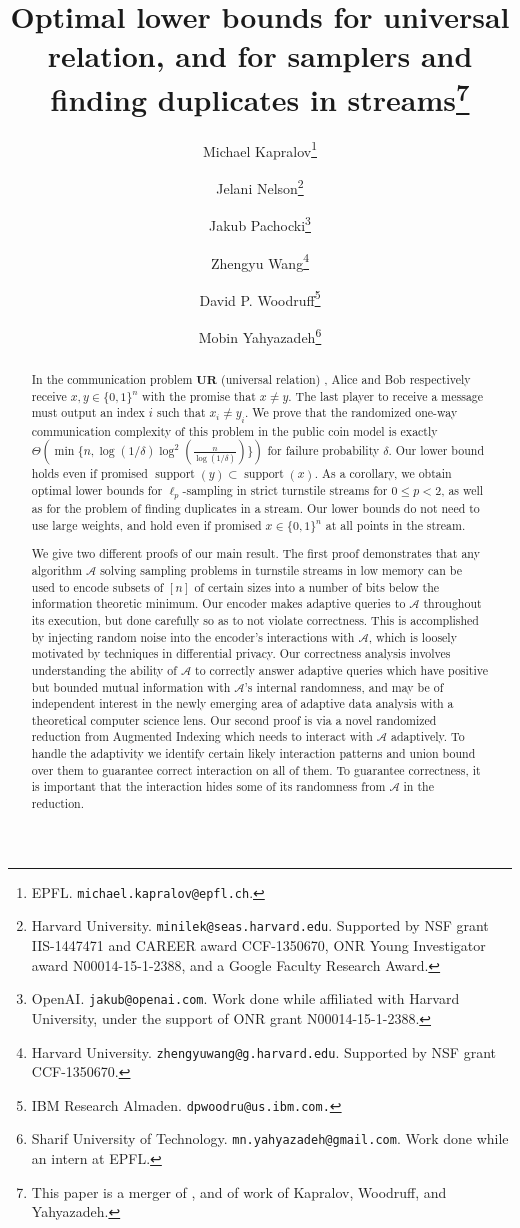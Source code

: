 \documentclass[11pt]{article}
\title{Optimal lower bounds for universal relation, and for samplers and finding duplicates in streams\footnote{This paper is a merger of \cite{NelsonPW17},
    and of work of Kapralov, Woodruff, and Yahyazadeh.}}
\author{
  Michael Kapralov\thanks{EPFL. \texttt{michael.kapralov@epfl.ch}.}
  \and Jelani Nelson\thanks{Harvard University. \texttt{minilek@seas.harvard.edu}. Supported by NSF grant IIS-1447471 and
   CAREER award CCF-1350670, ONR Young Investigator award N00014-15-1-2388, and a Google Faculty Research Award.}
  \and Jakub Pachocki\thanks{OpenAI. \texttt{jakub@openai.com}. Work done while affiliated with Harvard University, under the support of ONR grant N00014-15-1-2388.}
  \and Zhengyu Wang\thanks{Harvard University. \texttt{zhengyuwang@g.harvard.edu}. Supported by NSF grant CCF-1350670.}
  \and David P. Woodruff\thanks{IBM Research Almaden. \texttt{dpwoodru@us.ibm.com.}}
  \and Mobin Yahyazadeh\thanks{Sharif University of Technology. \texttt{mn.yahyazadeh@gmail.com}. Work done while an intern at EPFL.}}
\newcommand{\ur}{\mathbf{UR}\xspace}
\begin{document}
\setcounter{page}{0}

\maketitle

\thispagestyle{empty}

\begin{abstract}
In the communication problem $\ur$ (universal relation) \cite{KarchmerRW95}, Alice and Bob respectively receive $x, y \in\{0,1\}^n$ with the promise that $x\neq y$. The last player to receive a message must output an index $i$ such that $x_i\neq y_i$. We prove that the randomized one-way communication complexity of this problem in the public coin model is exactly $\Theta(\min\{n,\log(1/\delta)\log^2(\frac n{\log(1/\delta)})\})$ for failure probability $\delta$. Our lower bound holds even if promised $\mathop{support}(y)\subset \mathop{support}(x)$. As a corollary, we obtain optimal lower bounds for $\ell_p$-sampling in strict turnstile streams for $0\le p < 2$, as well as for the problem of finding duplicates in a stream. Our lower bounds do not need to use large weights, and hold even if promised $x\in\{0,1\}^n$ at all points in the stream. 

We give two different proofs of our main result. The first proof demonstrates that any algorithm $\mathcal A$ solving sampling problems in turnstile streams in low memory can be used to encode subsets of $[n]$ of certain sizes into a number of bits below the information theoretic minimum. Our encoder makes adaptive queries to $\mathcal A$ throughout its execution, but done carefully so as to not violate correctness. This is accomplished by injecting random noise into the encoder's interactions with $\mathcal A$, which is loosely motivated by techniques in differential privacy. Our correctness analysis involves understanding the ability of $\mathcal A$ to correctly answer adaptive queries which have positive but bounded mutual information with $\mathcal A$'s internal randomness, and may be of independent interest in the newly emerging area of adaptive data analysis with a theoretical computer science lens. Our second proof is via a novel randomized reduction from Augmented Indexing \cite{MiltersenNSW98} which needs to interact with $\mathcal A$ adaptively. To handle the adaptivity we identify certain likely interaction patterns and union bound over them to guarantee correct interaction on all of them. To guarantee correctness, it is important that the interaction hides some of its randomness from $\mathcal A$ in the reduction.
\end{abstract}
\end{document}
